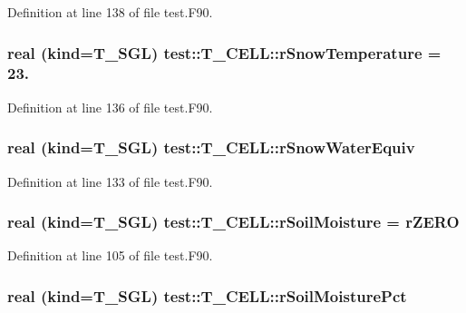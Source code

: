 Definition at line 138 of file test.F90.

\hypertarget{typetest_1_1_t___c_e_l_l_a1d63bbded70f8f71a6779c3f9e9a00b5}{
\subsubsection[{rSnowTemperature}]{\setlength{\rightskip}{0pt plus 5cm}real (kind={\bf T\_\-SGL}) {\bf test::T\_\-CELL::rSnowTemperature} = 23.}}
\label{typetest_1_1_t___c_e_l_l_a1d63bbded70f8f71a6779c3f9e9a00b5}


Definition at line 136 of file test.F90.

\hypertarget{typetest_1_1_t___c_e_l_l_ade6352246523778acc8b0802f262b7bb}{
\subsubsection[{rSnowWaterEquiv}]{\setlength{\rightskip}{0pt plus 5cm}real (kind={\bf T\_\-SGL}) {\bf test::T\_\-CELL::rSnowWaterEquiv}}}
\label{typetest_1_1_t___c_e_l_l_ade6352246523778acc8b0802f262b7bb}


Definition at line 133 of file test.F90.

\hypertarget{typetest_1_1_t___c_e_l_l_a7b9a3dc790903d4b2637f47b1ad273c1}{
\subsubsection[{rSoilMoisture}]{\setlength{\rightskip}{0pt plus 5cm}real (kind={\bf T\_\-SGL}) {\bf test::T\_\-CELL::rSoilMoisture} = {\bf rZERO}}}
\label{typetest_1_1_t___c_e_l_l_a7b9a3dc790903d4b2637f47b1ad273c1}


Definition at line 105 of file test.F90.

\hypertarget{typetest_1_1_t___c_e_l_l_a0685f8e80f87ae9788c374a8c672e23a}{
\subsubsection[{rSoilMoisturePct}]{\setlength{\rightskip}{0pt plus 5cm}real (kind={\bf T\_\-SGL}) {\bf test::T\_\-CELL::rSoilMoisturePct}}}
\label{typetest_1_1_t___c_e_l_l_a0685f8e80f87ae9788c374a8c672e23a}


